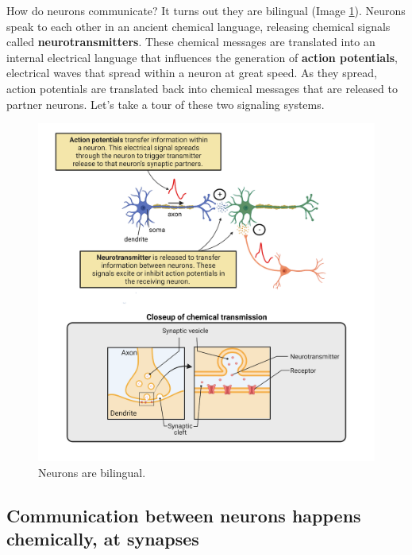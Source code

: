 \documentclass[
]{book}
\begin{document}
How do neurons communicate? It turns out they are bilingual (Image \ref{fig:ch02-01}). Neurons speak to each other in an ancient chemical language, releasing chemical signals called \textbf{neurotransmitters}. These chemical messages are translated into an internal electrical language that influences the generation of \textbf{action potentials}, electrical waves that spread within a neuron at great speed. As they spread, action potentials are translated back into chemical messages that are released to partner neurons. Let's take a tour of these two signaling systems.

\begin{figure}

{\centering \includegraphics[width=0.9\linewidth]{images/ch02/02_01} 

}

\caption{Neurons are bilingual.}\label{fig:ch02-01}
\end{figure}

\hypertarget{communication-between-neurons-happens-chemically-at-synapses}{%
\subsection{\texorpdfstring{Communication between neurons happens chemically, at \textbf{synapses}}{Communication between neurons happens chemically, at synapses}}\label{communication-between-neurons-happens-chemically-at-synapses}}
\end{document}
